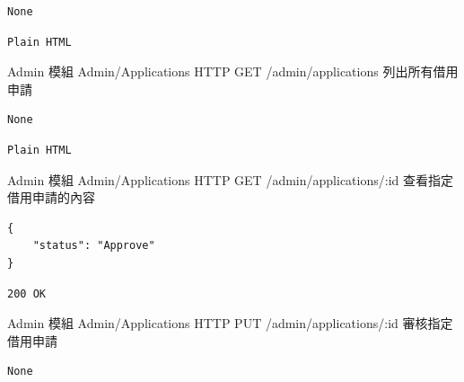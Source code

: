 \documentclass{article}
\begin{document}
\bigskip

\begin{lrbox}{\jsoninputbox}
	\begin{lstlisting}
None
\end{lstlisting}
\end{lrbox}

\begin{lrbox}{\jsonoutputbox}
	\begin{lstlisting}
Plain HTML
\end{lstlisting}
\end{lrbox}

{Admin 模組}
{Admin/Applications}
{HTTP GET}
{/admin/applications}
{列出所有借用申請}

\bigskip

\begin{lrbox}{\jsoninputbox}
	\begin{lstlisting}
None
\end{lstlisting}
\end{lrbox}

\begin{lrbox}{\jsonoutputbox}
	\begin{lstlisting}
Plain HTML
\end{lstlisting}
\end{lrbox}

{Admin 模組}
{Admin/Applications}
{HTTP GET}
{/admin/applications/:id}
{查看指定借用申請的內容}

\bigskip

\begin{lrbox}{\jsoninputbox}
	\begin{lstlisting}[basicstyle=\footnotesize\ttfamily]
{
	"status": "Approve"
}
\end{lstlisting}
\end{lrbox}

\begin{lrbox}{\jsonoutputbox}
	\begin{lstlisting}
200 OK
\end{lstlisting}
\end{lrbox}

{Admin 模組}
{Admin/Applications}
{HTTP PUT}
{/admin/applications/:id}
{審核指定借用申請}

\bigskip

\begin{lrbox}{\jsoninputbox}
	\begin{lstlisting}
None
\end{lstlisting}
\end{lrbox}
\end{document}
